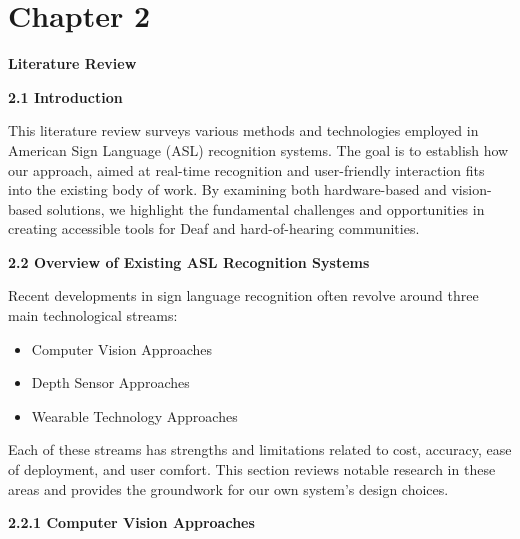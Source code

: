 \documentclass[12pt]{article}
\begin{document}
\newpage
\section*{Chapter 2}
\begin{center}
    \large \textbf{Literature Review}
\end{center}

\vspace{1.5em}
\noindent
\textbf{2.1 Introduction}
\vspace{1em}

This literature review surveys various methods and technologies employed in American 
Sign Language (ASL) recognition systems. The goal is to establish how our approach, aimed 
at real-time recognition and user-friendly interaction fits into the existing body of work.
By examining both hardware-based and vision-based solutions, we highlight the fundamental 
challenges and opportunities in creating accessible tools for Deaf and hard-of-hearing 
communities.

\vspace{1.5em}
\noindent
\textbf{2.2 Overview of Existing ASL Recognition Systems}
\vspace{1em}

Recent developments in sign language recognition often revolve around three main 
technological streams:

\begin{itemize}
    \item Computer Vision Approaches
    \item Depth Sensor Approaches
    \item Wearable Technology Approaches
\end{itemize}

Each of these streams has strengths and limitations related to cost, accuracy, ease of 
deployment, and user comfort. This section reviews notable research in these areas and 
provides the groundwork for our own system’s design choices.

\vspace{1.0em}
\noindent
\textbf{2.2.1 Computer Vision Approaches}
\vspace{0.5em}
\end{document}
